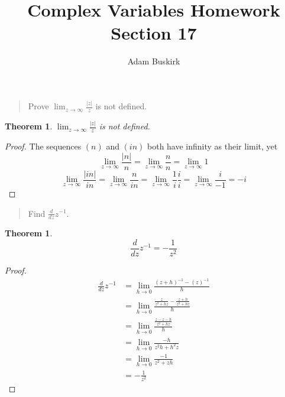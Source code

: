\documentclass{article}
\title{Complex Variables Homework Section 17}
\author{Adam Buskirk}
\newtheorem{theorem}[subsection]{Theorem}
\theoremstyle{definition}
\begin{document}
\maketitle

\begin{quote}
Prove $\lim_{z\to\infty} \frac{|z|}{z}$ is not defined.
\end{quote}
\begin{theorem}
$\lim_{z\to\infty} \frac{|z|}{z}$ is not defined.
\end{theorem}
\begin{proof}
The sequences $(n)$ and $(in)$ both have infinity as their limit,
yet 
\[ 
\lim_{z\to\infty} \frac{|n|}{n} 
= \lim_{z\to\infty} \frac{n}{n} 
= \lim_{z\to\infty} 1
\]
\[
\lim_{z\to\infty} \frac{|in|}{in}
= \lim_{z\to\infty} \frac{n}{in}
= \lim_{z\to\infty} \frac{1}{i} \frac{i}{i}
= \lim_{z\to\infty} \frac{i}{-1}
= -i
\]
\end{proof}

\begin{quote}
Find $\frac{d}{dz} z^{-1}$.
\end{quote}
\begin{theorem}
\[ \frac{d}{dz} z^{-1} = -\frac{1}{z^2} \]
\end{theorem}
\begin{proof}
\begin{align*}
\frac{d}{dz} z^{-1} 
&= \lim_{h \to 0} \frac{(z+h)^{-1} - (z)^{-1}}{h} \\
&= \lim_{h \to 0} \frac{\frac{z}{z^2+hz} - \frac{z+h}{z^2+hz}}{h}\\
&= \lim_{h \to 0} \frac{\frac{z-z-h}{z^2+hz}}{h} \\
&= \lim_{h \to 0} \frac{-h}{z^2h+h^2z}\\
&= \lim_{h \to 0} \frac{-1}{z^2+zh} \\
&= -\frac{1}{z^2}
\end{align*}
\end{proof}
\end{document}
